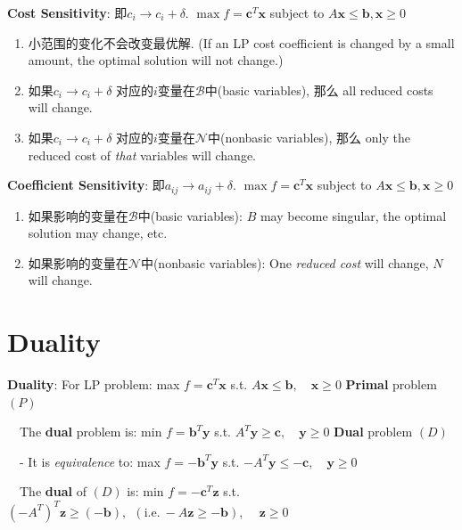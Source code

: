 \documentclass[9pt]{article}
\begin{document}
\textbf{Cost Sensitivity}: 即$c_i\to c_i+\delta$. \quad $\max f=\mathbf{c}^T\mathbf{x}$ subject to $A\mathbf{x}\leq \mathbf{b},\mathbf{x}\geq0$

\begin{enumerate}[itemsep=-2pt, topsep=-2pt]
    \item 小范围的变化不会改变最优解. {\scriptsize (If an LP cost coefficient is changed by a small amount, the optimal solution will not change.)}
    \item 如果$c_i\to c_i+\delta$ 对应的$i$变量在$\mathcal{B}$中(basic variables), 那么 all reduced costs will change.
    \item 如果$c_i\to c_i+\delta$ 对应的$i$变量在$\mathcal{N}$中(nonbasic variables), 那么 only the reduced cost of \textit{that} variables will change.
\end{enumerate}

\textbf{Coefficient Sensitivity}: 即$a_{ij}\to a_{ij}+\delta$. \quad $\max f=\mathbf{c}^T\mathbf{x}$ subject to $A\mathbf{x}\leq \mathbf{b},\mathbf{x}\geq0$

\begin{enumerate}[itemsep=-2pt, topsep=-2pt]
    \item 如果影响的变量在$\mathcal{B}$中(basic variables): $B$ may become singular, the optimal solution may change, etc.
    \item 如果影响的变量在$\mathcal{N}$中(nonbasic variables): One \textit{reduced cost} will change, $N$ will change.
\end{enumerate}



\section{Duality} %

\textbf{Duality}: For LP problem: max $f=\mathbf{c}^T\mathbf{x}$ \quad s.t. $A\mathbf{x}\leq \mathbf{b}, \quad\mathbf{x}\geq0$ \quad \textbf{Primal} problem \qquad $(P)$

\qquad \ \ The \textbf{dual} problem is: min $f=\mathbf{b}^T\mathbf{y}$ \quad s.t. $A^T\mathbf{y}\geq \mathbf{c}, \quad\mathbf{y}\geq0$ \quad \textbf{Dual} problem \qquad $(D)$

\qquad \ \ - It is \textit{equivalence} to: max $f=-\mathbf{b}^T\mathbf{y}$ \quad s.t. $-A^T\mathbf{y}\leq -\mathbf{c}, \quad\mathbf{y}\geq0$

\qquad \ \ The \textbf{dual} of $(D)$ is: min $f=-\mathbf{c}^T\mathbf{z}$ \quad s.t. $(-A^T)^T\mathbf{z}\geq (-\mathbf{b}), \ \ (\text{i.e.} \ -A\mathbf{z}\geq -\mathbf{b})$, $\quad\mathbf{z}\geq0$
\end{document}
